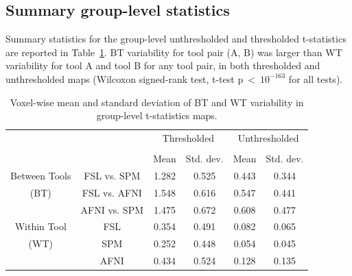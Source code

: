 \documentclass[conference]{IEEEtran}
\begin{document}
\subsection{Summary group-level statistics}

Summary statistics for the group-level unthresholded and thresholded
t-statistics are reported in Table~\ref{table:pipeline-stats}. BT
variability for tool pair (A, B) was larger than WT variability for tool A and tool B for any tool pair, in both thresholded and
unthresholded maps (Wilcoxon signed-rank test, t-test
p~\textless~$10^{-163}$ for all tests).



\setlength{\tabcolsep}{5pt}
\begin{table}[h]
    \centering
    \begin{tabular}{cccc|cc}
        \toprule
        \multirow{2}{*}{}& {} & \multicolumn{2}{c}{Thresholded} & \multicolumn{2}{c}{Unthresholded} \\
        \cmidrule{3-4} \cmidrule{5-6} \\
        {} & {} & Mean & Std. dev. & Mean & Std. dev. \\
        \midrule
        \rowcolor{lightgray}
        {Between Tools} & FSL vs. SPM        &  1.282       & 0.525      & 0.443     & 0.344  \\
        \rowcolor{lightgray}
        {(BT)} & FSL vs. AFNI                &  1.548       & 0.616      & 0.547     & 0.441  \\
        \rowcolor{lightgray}
        {} & AFNI vs. SPM                    &  1.475       & 0.672      & 0.608     & 0.477  \\
        {Within Tool} & FSL                  &  0.354       & 0.491      & 0.082     & 0.065  \\
        {(WT)}   & SPM                       &  0.252       & 0.448      & 0.054     & 0.045  \\
        {}   & AFNI                          &  0.434       & 0.524      & 0.128     & 0.135  \\
        \bottomrule
    \end{tabular}
    \caption{Voxel-wise mean and standard deviation of BT and WT variability
    in group-level t-statistics maps.}
    \label{table:pipeline-stats}
\end{table}
\end{document}
